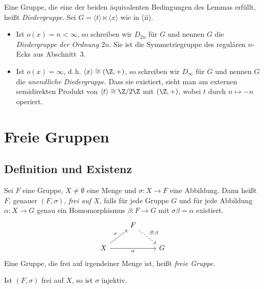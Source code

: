 \documentclass[11pt]{article}
\begin{document}
\begin{ergaenzung}
\begin{definition}[Diedergruppe]\Theorem
  Eine Gruppe, die eine der beiden äquivalenten Bedingungen des Lemmas erfüllt, heißt \emph{Diedergruppe}. Sei $G = \langle t \rangle \ltimes \langle x \rangle$ wie in (ii).
  \begin{itemize}
    \item Ist $o(x) = n < \infty$, so schreiben wir $D_{2n}$ für $G$ und nennen $G$ die \emph{Diedergruppe der Ordnung $2n$}. Sie ist die Symmetriegruppe des regulären $n$-Ecks aus Abschnitt~3.
    \item Ist $o(x) = \infty$, d.\,h. $\langle x \rangle \cong (\Z, +)$, so schreiben wir $D_\infty$ für $G$ und nennen $G$ die \emph{unendliche Diedergruppe}. Dass sie existiert, sieht man am externen semidirekten Produkt von $\langle t \rangle \cong \Z/2\Z$ mit $(\Z, +)$, wobei $t$ durch $n \mapsto -n$ operiert.
  \end{itemize}
\end{definition}
\end{ergaenzung}


\section{Freie Gruppen}

\subsection{Definition und Existenz}

\begin{definition}\Theorem
  Sei $F$ eine Gruppe, $X \neq \emptyset$ eine Menge und $\sigma\colon X \to F$ eine Abbildung. Dann heißt $F$, genauer $(F, \sigma)$, \emph{frei auf $X$}, falls für jede Gruppe $G$ und für jede Abbildung $\alpha\colon X \to G$ genau ein Homomorphismus $\beta\colon F \to G$ mit $\sigma\beta = \alpha$ existiert.
  \[
    \begin{tikzcd}
      & F \arrow[dashed]{dr}{\exists!\, \beta} & \\
      X \arrow{ur}{\sigma} \arrow[swap]{rr}{\alpha} & & G
    \end{tikzcd}
  \]
  Eine Gruppe, die frei auf irgendeiner Menge ist, heißt \emph{freie Gruppe}.
\end{definition}


\begin{note}
  Ist $(F, \sigma)$ frei auf $X$, so ist $\sigma$ injektiv.
\end{note}
\end{document}
